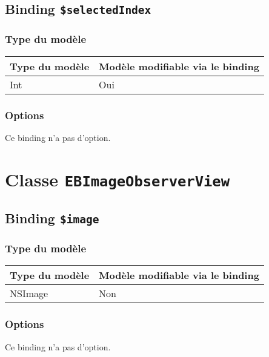 \subsection{Binding \texttt{\$selectedIndex}}

\subsubsection{Type du modèle}

\begin{tabular}{|l|l|}
\hline
\textbf{Type du modèle} & \textbf{Modèle modifiable via le binding}\\
\hline
Int & Oui\\
\hline
\end{tabular}
\subsubsection{Options}

Ce binding n'a pas d'option.








\section{Classe \texttt{EBImageObserverView}}

\subsection{Binding \texttt{\$image}}

\subsubsection{Type du modèle}

\begin{tabular}{|l|l|}
\hline
\textbf{Type du modèle} & \textbf{Modèle modifiable via le binding}\\
\hline
NSImage & Non\\
\hline
\end{tabular}
\subsubsection{Options}

Ce binding n'a pas d'option.








